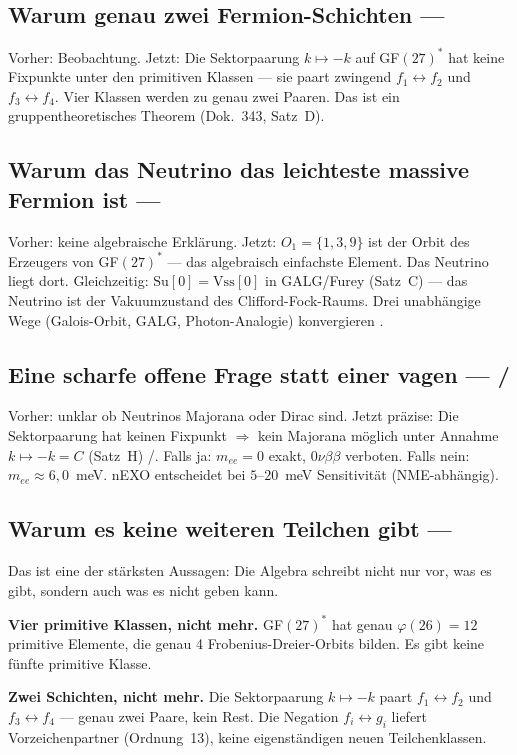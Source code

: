 \subsection*{Warum genau zwei Fermion-Schichten --- \BM}
Vorher: Beobachtung.
Jetzt: Die Sektorpaarung $k\mapsto-k$ auf GF$(27)^*$ hat keine Fixpunkte
unter den primitiven Klassen --- sie paart zwingend $f_1\leftrightarrow f_2$
und $f_3\leftrightarrow f_4$. Vier Klassen werden zu genau zwei Paaren.
Das ist ein gruppentheoretisches Theorem (Dok.~343, Satz~D).

\subsection*{Warum das Neutrino das leichteste massive Fermion ist --- \BM}
Vorher: keine algebraische Erklärung.
Jetzt: $O_1=\{1,3,9\}$ ist der Orbit des Erzeugers von GF$(27)^*$ ---
das algebraisch einfachste Element. Das Neutrino liegt dort.
Gleichzeitig: $\mathrm{Su}[0]=\mathrm{Vss}[0]$ in GALG/Furey (Satz~C) ---
das Neutrino ist der Vakuumzustand des Clifford-Fock-Raums.
Drei unabhängige Wege (Galois-Orbit, GALG, Photon-Analogie) konvergieren \BM.

\subsection*{Eine scharfe offene Frage statt einer vagen --- \BM/\SM}
Vorher: unklar ob Neutrinos Majorana oder Dirac sind.
Jetzt präzise: Die Sektorpaarung hat keinen Fixpunkt $\Rightarrow$ kein Majorana
möglich unter Annahme $k\mapsto-k = C$ (Satz~H) \BM/\SM.
Falls ja: $m_{ee}=0$ exakt, $0\nu\beta\beta$ verboten.
Falls nein: $m_{ee}\approx6{,}0$~meV.
nEXO entscheidet bei $5$--$20$~meV Sensitivität (NME-abhängig).


\subsection*{Warum es keine weiteren Teilchen gibt --- \BM}

Das ist eine der stärksten Aussagen: Die Algebra schreibt nicht nur vor,
was es gibt, sondern auch was es nicht geben kann.

\textbf{Vier primitive Klassen, nicht mehr.}
GF$(27)^*$ hat genau $\varphi(26)=12$ primitive Elemente, die genau
4 Frobenius-Dreier-Orbits bilden. Es gibt keine fünfte primitive Klasse.

\textbf{Zwei Schichten, nicht mehr.}
Die Sektorpaarung $k\mapsto-k$ paart $f_1\leftrightarrow f_2$ und
$f_3\leftrightarrow f_4$ --- genau zwei Paare, kein Rest.
Die Negation $f_i\leftrightarrow g_i$ liefert Vorzeichenpartner
(Ordnung~13), keine eigenständigen neuen Teilchenklassen.

